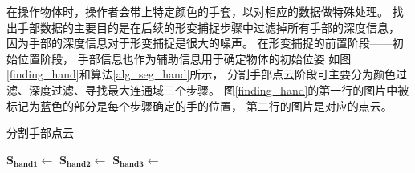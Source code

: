 在操作物体时，操作者会带上特定颜色的手套，以对相应的数据做特殊处理。
找出手部数据的主要目的是在后续的形变捕捉步骤中过滤掉所有手部的深度信息，
因为手部的深度信息对于形变捕捉是很大的噪声。
在形变捕捉的前置阶段——初始位置阶段，
手部信息也作为辅助信息用于确定物体的初始位姿
如图\ref{finding_hand}和算法\ref{alg_seg_hand}所示，
分割手部点云阶段可主要分为颜色过滤、深度过滤、寻找最大连通域三个步骤。
图\ref{finding_hand}的第一行的图片中被标记为蓝色的部分是每个步骤确定的手的位置，
第二行的图片是对应的点云。
\begin{algorithm}
    \caption{分割手部点云}
    \label{alg_seg_hand}
    \begin{algorithmic}[1]
            \State $\bm{S_{hand1}} \gets$ 
            \State $\bm{S_{hand2}} \gets$ 
            \State $\bm{S_{hand3}} \gets$ 
        \EndProcedure
    \end{algorithmic}
\end{algorithm}
